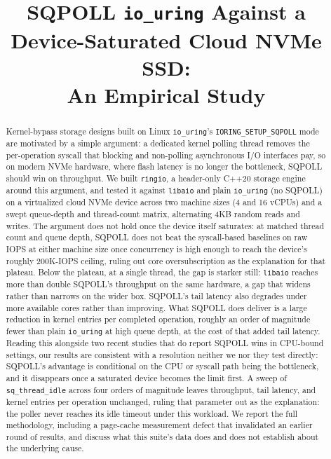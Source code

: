 \documentclass[conference]{IEEEtran}
\begin{document}
\title{SQPOLL \texttt{io\_uring} Against a Device-Saturated Cloud NVMe SSD:\\An Empirical Study}

\author{
}

\maketitle

\begin{abstract}
Kernel-bypass storage designs built on Linux \texttt{io\_uring}'s \texttt{IORING\_SETUP\_SQPOLL}
mode are motivated by a simple argument: a dedicated kernel polling thread removes the
per-operation syscall that blocking and non-polling asynchronous I/O interfaces pay, so on
modern NVMe hardware, where flash latency is no longer the bottleneck, SQPOLL should win on
throughput. We built \texttt{ringio}, a header-only C++20 storage engine around this argument,
and tested it against \texttt{libaio} and plain \texttt{io\_uring} (no SQPOLL) on a virtualized
cloud NVMe device across two machine sizes (4 and 16 vCPUs) and a swept queue-depth and
thread-count matrix, alternating 4KB random reads and writes. The argument does not hold once the
device itself saturates: at matched thread count and queue depth, SQPOLL does not beat the
syscall-based baselines on raw IOPS at either machine size once concurrency is high enough to
reach the device's roughly 200K-IOPS ceiling, ruling out core oversubscription as the
explanation for that plateau. Below the plateau, at a single thread, the gap is starker still:
\texttt{libaio} reaches more than double SQPOLL's throughput on the same hardware, a gap that
widens rather than narrows on the wider box. SQPOLL's tail latency also degrades under more
available cores rather than improving. What SQPOLL does deliver is a large reduction in kernel
entries per completed operation, roughly an order of magnitude fewer than plain \texttt{io\_uring}
at high queue depth, at the cost of that added tail latency. Reading this alongside two recent
studies that do report SQPOLL wins in CPU-bound settings, our results are consistent with a
resolution neither we nor they test directly: SQPOLL's advantage is conditional on the CPU or
syscall path being the bottleneck, and it disappears once a saturated device becomes the limit
first. A sweep of \texttt{sq\_thread\_idle} across four orders of magnitude leaves throughput, tail
latency, and kernel entries per operation unchanged, ruling that parameter out as the
explanation: the poller never reaches its idle timeout under this workload. We report the full
methodology, including a page-cache measurement defect that invalidated an earlier round of
results, and discuss what this suite's data does and does not establish about the underlying
cause.
\end{abstract}
\end{document}
